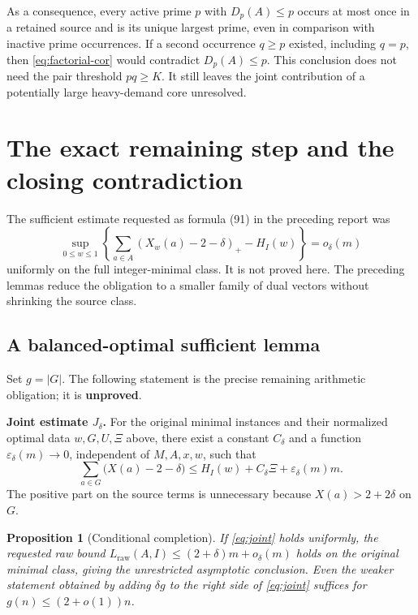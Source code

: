 \documentclass[11pt,a4paper]{article}
\newtheorem{proposition}[theorem]{Proposition}
\theoremstyle{remark}
\newcommand{\pos}[1]{(#1)_+}
\newcommand{\LP}{L_{\mathrm{raw}}}
\begin{document}
As a consequence, every active prime \(p\) with \(D_p(A)\le p\)
occurs at most once in a retained source and is its unique largest
prime, even in comparison with inactive prime occurrences. If a
second occurrence \(q\ge p\) existed, including \(q=p\), then
\eqref{eq:factorial-cor} would contradict \(D_p(A)\le p\).
This conclusion does not need the pair threshold \(pq\ge K\).
It still leaves the joint contribution of a potentially large
heavy-demand core unresolved.

\section{The exact remaining step and the closing contradiction}

The sufficient estimate requested as formula (91) in the preceding
report was
\[
 \sup_{0\le w\le1}\left\{
 \sum_{a\in A}\pos{X_w(a)-2-\delta}-H_I(w)\right\}
 =o_\delta(m)
\]
uniformly on the full integer-minimal class. It is not proved here.
The preceding lemmas reduce the obligation to a smaller family of
dual vectors without shrinking the source class.

\subsection{A balanced-optimal sufficient lemma}

Set \(g=|G|\). The following statement is the precise remaining
arithmetic obligation; it is \textbf{unproved}.

\medskip
\noindent\textbf{Joint estimate \(J_\delta\).}
For the original minimal instances and their normalized optimal
data \(w,G,U,\Xi\) above, there exist a constant \(C_\delta\) and
a function \(\varepsilon_\delta(m)\to0\), independent of
\(M,A,x,w\), such that
\begin{equation}
 \boxed{\quad
 \sum_{a\in G}\bigl(X(a)-2-\delta\bigr)
 \le H_I(w)+C_\delta\Xi+
       \varepsilon_\delta(m)m.
 \quad}
 \label{eq:joint}
\end{equation}
The positive part on the source terms is unnecessary because
\(X(a)>2+2\delta\) on \(G\).

\begin{proposition}[Conditional completion]
\label{prop:completion}
If \eqref{eq:joint} holds uniformly, the requested raw bound
\(\LP(A,I)\le(2+\delta)m+o_\delta(m)\) holds on the original
minimal class, giving the unrestricted asymptotic conclusion.
Even the weaker statement obtained by adding \(\delta g\) to the
right side of \eqref{eq:joint} suffices for
\(g(n)\le(2+o(1))n\).
\end{proposition}
\end{document}
